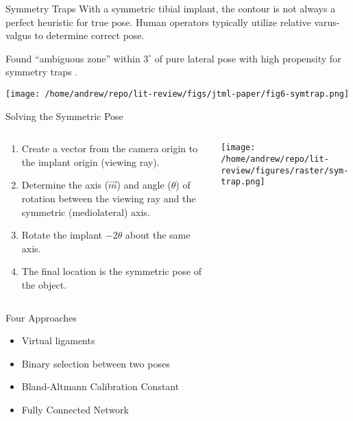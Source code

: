 \documentclass[presentation, aspectratio=1610]{beamer}
\begin{document}
\begin{frame}[label={sec:org8e2e61c}]{Symmetry Traps}
With a symmetric tibial implant, the contour is not always a perfect heuristic for true pose. Human operators typically utilize relative varus-valgus to determine correct pose.

Found ``ambiguous zone'' within \(3^{\circ}\) of pure lateral pose with high propensity for symmetry traps \autocite{jensenJointTrackMachine2022}.

\begin{center}
\texttt{[image: /home/andrew/repo/lit-review/figs/jtml-paper/fig6-symtrap.png]}
\end{center}
\end{frame}
\begin{frame}[label={sec:orgc3506cf}]{Solving the Symmetric Pose}
\begin{columns}
\begin{column}{0.5\columnwidth}
\begin{enumerate}
\item Create a vector from the camera origin to the implant origin (viewing ray).
\item Determine the axis (\(\vec{m}\)) and angle (\(\theta\)) of rotation between the viewing ray and the symmetric (mediolateral) axis.
\item Rotate the implant \(-2\theta\) about the same axis.
\item The final location is the symmetric pose of the object.
\end{enumerate}
\end{column}
\begin{column}{0.6\columnwidth}
\begin{center}
\texttt{[image: /home/andrew/repo/lit-review/figures/raster/sym-trap.png]}
\end{center}
\end{column}
\end{columns}
\end{frame}
\begin{frame}[label={sec:org9ef34cf}]{Four Approaches}
\begin{itemize}
\item Virtual ligaments
\item Binary selection between two poses
\item Bland-Altmann Calibration Constant
\item Fully Connected Network
\end{itemize}
\end{frame}
\end{document}
